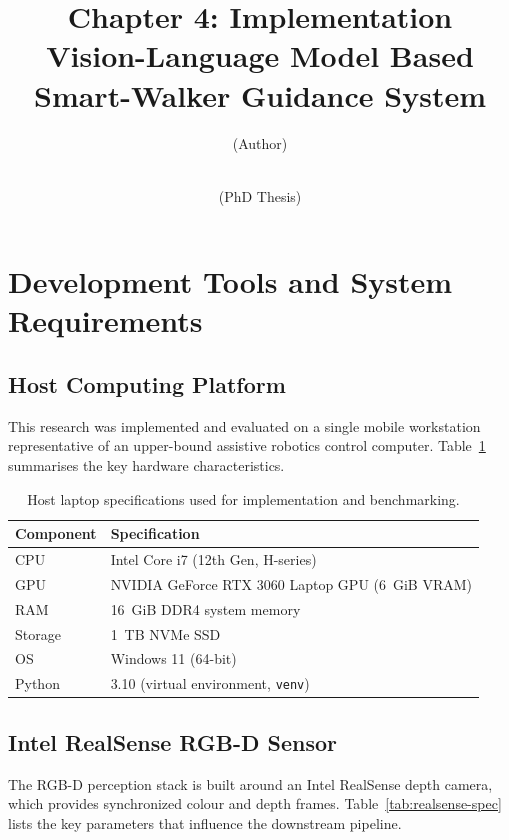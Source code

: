 \documentclass[11pt,a4paper]{article}
\title{Chapter 4: Implementation\\Vision-Language Model Based Smart-Walker Guidance System}
\author{(Author)}
\date{\\(PhD Thesis)}
\newcommand{\code}[1]{\texttt{#1}}
\begin{document}
\maketitle

\section{Development Tools and System Requirements}

\subsection{Host Computing Platform}
This research was implemented and evaluated on a single mobile workstation representative of an upper-bound assistive robotics control computer. Table~\ref{tab:laptop-spec} summarises the key hardware characteristics.

\begin{table}[h]
  \centering
  \small
  \begin{tabular}{l p{8cm}}
    \toprule
    Component & Specification \\
    \midrule
    CPU & Intel Core i7 (12th Gen, H-series) \\
    GPU & NVIDIA GeForce RTX 3060 Laptop GPU (6~GiB VRAM) \\
    RAM & 16~GiB DDR4 system memory \\
    Storage & 1~TB NVMe SSD \\
    OS & Windows 11 (64-bit) \\
    Python & 3.10 (virtual environment, \code{venv}) \\
    \bottomrule
  \end{tabular}
  \caption{Host laptop specifications used for implementation and benchmarking.}
  \label{tab:laptop-spec}
\end{table}

\subsection{Intel RealSense RGB-D Sensor}
The RGB-D perception stack is built around an Intel RealSense depth camera, which provides synchronized colour and depth frames. Table~\ref{tab:realsense-spec} lists the key parameters that influence the downstream pipeline.
\end{document}

